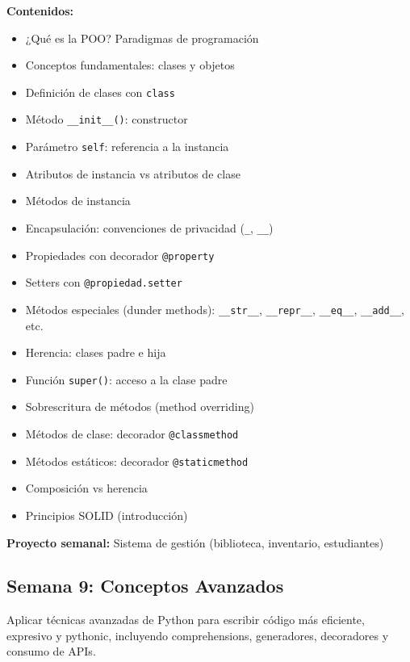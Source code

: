\documentclass[12pt,letterpaper]{article}
\begin{document}
\textbf{Contenidos:}
\begin{itemize}[leftmargin=*]
    \item ¿Qué es la POO? Paradigmas de programación
    \item Conceptos fundamentales: clases y objetos
    \item Definición de clases con \texttt{class}
    \item Método \texttt{\_\_init\_\_()}: constructor
    \item Parámetro \texttt{self}: referencia a la instancia
    \item Atributos de instancia vs atributos de clase
    \item Métodos de instancia
    \item Encapsulación: convenciones de privacidad (\texttt{\_}, \texttt{\_\_})
    \item Propiedades con decorador \texttt{@property}
    \item Setters con \texttt{@propiedad.setter}
    \item Métodos especiales (dunder methods): \texttt{\_\_str\_\_}, \texttt{\_\_repr\_\_}, \texttt{\_\_eq\_\_}, \texttt{\_\_add\_\_}, etc.
    \item Herencia: clases padre e hija
    \item Función \texttt{super()}: acceso a la clase padre
    \item Sobrescritura de métodos (method overriding)
    \item Métodos de clase: decorador \texttt{@classmethod}
    \item Métodos estáticos: decorador \texttt{@staticmethod}
    \item Composición vs herencia
    \item Principios SOLID (introducción)
\end{itemize}

\textbf{Proyecto semanal:} Sistema de gestión (biblioteca, inventario, estudiantes)

\subsection{Semana 9: Conceptos Avanzados}

\begin{objetivobox}
Aplicar técnicas avanzadas de Python para escribir código más eficiente, expresivo y pythonic, incluyendo comprehensions, generadores, decoradores y consumo de APIs.
\end{objetivobox}
\end{document}

